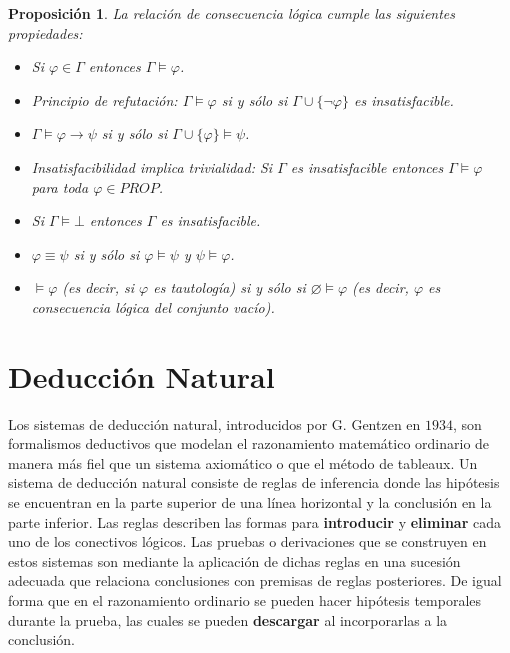 \documentclass[letterpaper,12pt]{article}
\newtheorem{prop}{Proposición}[]
\begin{document}
    \begin{prop}
        La relación de consecuencia lógica cumple las siguientes propiedades:
        \begin{itemize}
            \item Si $\varphi \in \Gamma$ entonces $\Gamma \models \varphi$.
            \item Principio de refutación: $\Gamma \models \varphi$ si y 
            sólo si $\Gamma \cup \{ \neg \varphi\}$ es insatisfacible.
            \item $\Gamma \models \varphi \rightarrow \psi$ si y sólo si 
            $\Gamma \cup \{ \varphi \} \models \psi$.
            \item Insatisfacibilidad implica trivialidad: Si $\Gamma$ es 
            insatisfacible entonces $\Gamma \models \varphi$ para toda 
            $\varphi \in PROP$.
            \item Si $\Gamma \models \bot$ entonces $\Gamma$ es insatisfacible.
            \item $\varphi \equiv \psi$ si y sólo si $\varphi \models \psi$ y 
            $\psi \models \varphi$.
            \item $\models \varphi$ (es decir, si $\varphi$ es tautología)
            si y sólo si $\varnothing \models \varphi$ (es decir, $\varphi$
            es consecuencia lógica del conjunto vacío).
        \end{itemize}
    \end{prop}

    \section{Deducción Natural}
    Los sistemas de deducción natural, introducidos por G. Gentzen en $1934$,
    son formalismos deductivos que modelan el razonamiento matemático ordinario
    de manera más fiel que un sistema axiomático o que el método de tableaux.
    \newline
    Un sistema de deducción natural consiste de reglas de inferencia donde las
    hipótesis se encuentran en la parte superior de una línea horizontal y la 
    conclusión en la parte inferior. Las reglas describen las formas para 
    \textbf{introducir} y \textbf{eliminar} cada uno de los conectivos lógicos.
    Las pruebas o derivaciones que se construyen en estos sistemas son 
    mediante la aplicación de dichas reglas en una sucesión adecuada que 
    relaciona conclusiones con premisas de reglas posteriores. De igual forma
    que en el razonamiento ordinario se pueden hacer hipótesis temporales 
    durante la prueba, las cuales se pueden \textbf{descargar} al 
    incorporarlas a la conclusión.
\end{document}
